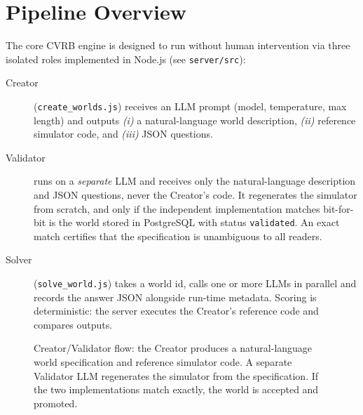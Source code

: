 \documentclass[11pt]{article}
\begin{document}
\section{Pipeline Overview}
The core CVRB engine is designed to run without human intervention via three isolated roles
implemented in Node.js (see \verb|server/src|):
\begin{description}
  \item[Creator] (\verb|create_worlds.js|) receives an LLM prompt (model,
        temperature, max length) and outputs \emph{(i)} a natural-language world
        description, \emph{(ii)} reference simulator code, and \emph{(iii)} JSON
        questions.
  \item[Validator] runs on a \emph{separate} LLM and receives only the natural-language description and JSON questions, never the Creator’s code. It regenerates the simulator from scratch, and only if the independent implementation matches bit-for-bit is the world stored in PostgreSQL with status \texttt{validated}. An exact match certifies that the specification is unambiguous to all readers.
  \item[Solver] (\verb|solve_world.js|) takes a world id, calls one or more
        LLMs in parallel and records the answer JSON alongside run-time
        metadata.  Scoring is deterministic: the server executes the Creator's
        reference code and compares outputs.
\end{description}


\begin{figure}[H]
\centering
{}
\caption{Creator/Validator flow: the Creator produces a natural-language world specification and reference simulator code. A separate Validator LLM regenerates the simulator from the specification. If the two implementations match exactly, the world is accepted and promoted.}
\label{fig:creator-flow}
\end{figure}
\end{document}
